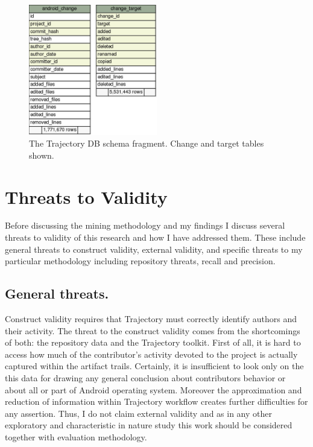 \documentclass[a4paper,10pt]{article}
\numberwithin{equation}{subsection}
\begin{document}
\begin{figure}
   \begin{center}
   \includegraphics[scale=0.4,width=0.5\textwidth]{figures/schema-change-fragment.png}
   \end{center}
   \caption{The Trajectory DB schema fragment. Change and target tables shown.}
   \label{fig:schema_change_fragment}
\end{figure}

\section{Threats to Validity}
Before discussing the mining methodology and my findings I discuss several threats to validity 
of this research and how I have addressed them. These include general threats to construct 
validity, external validity, and specific threats to my particular methodology including 
repository threats, recall and precision. 

\subsection{General threats.}
Construct validity requires that Trajectory must correctly identify authors and their activity.
The threat to the construct validity comes from the shortcomings of both: the repository data and
the Trajectory toolkit. First of all, it is hard to access how much of the contributor's activity 
devoted to the project is actually captured within the artifact trails. Certainly, it is 
insufficient to look only on the this data for drawing any general conclusion about contributors 
behavior or about all or part of Android operating system. Moreover the approximation and reduction 
of information within Trajectory workflow creates further difficulties for any assertion. Thus,
I do not claim external validity and as in any other exploratory and characteristic in nature 
study this work should be considered together with evaluation methodology.
\end{document}
